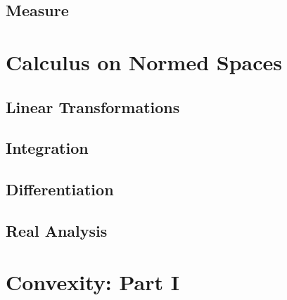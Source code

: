 \documentclass[crop=false,class=book]{standalone}
\begin{document}
\subsection{Measure}
\section{Calculus on Normed Spaces}
\subsection{Linear Transformations}
\subsection{Integration}
\subsection{Differentiation}
\subsection{Real Analysis}
\section{Convexity: Part I}
\end{document}
